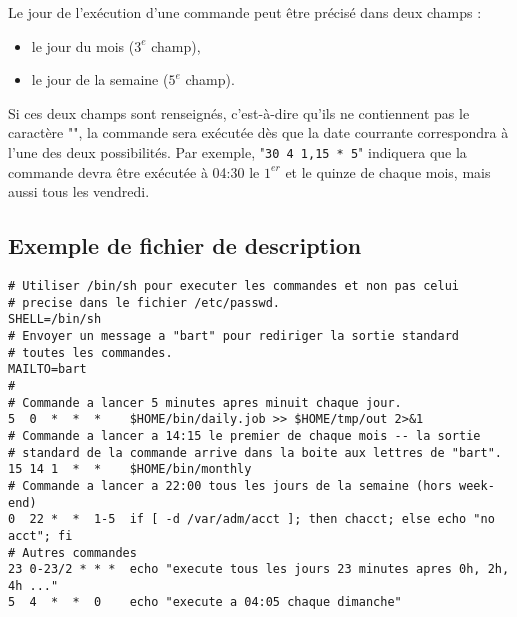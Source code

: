 \begin{remarque}
Le jour de l'ex{\'e}cution d'une commande peut {\^e}tre pr{\'e}cis{\'e} dans deux champs :
\begin{itemize}
	\item	le jour du mois ($3^e$ champ),
	\item	le jour de la semaine ($5^e$ champ).
\end{itemize}
Si ces deux champs sont renseign{\'e}s, c'est-{\`a}-dire qu'ils ne contiennent pas le
caract{\`e}re "{\tt *}", la commande sera ex{\'e}cut{\'e}e d{\`e}s que la date courrante correspondra
{\`a} l'une des deux possibilit{\'e}s. Par exemple, "{\tt 30 4 1,15 * 5}" indiquera que la
commande devra {\^e}tre ex{\'e}cut{\'e}e {\`a} 04:30 le $1^{er}$ et le quinze de chaque mois, mais
aussi tous les vendredi.
\end{remarque}

\subsection{Exemple de fichier de description}

\begin{example}
\begin{verbatim}
# Utiliser /bin/sh pour executer les commandes et non pas celui
# precise dans le fichier /etc/passwd.
SHELL=/bin/sh
# Envoyer un message a "bart" pour rediriger la sortie standard
# toutes les commandes.
MAILTO=bart
#
# Commande a lancer 5 minutes apres minuit chaque jour.
5  0  *  *  *    $HOME/bin/daily.job >> $HOME/tmp/out 2>&1
# Commande a lancer a 14:15 le premier de chaque mois -- la sortie
# standard de la commande arrive dans la boite aux lettres de "bart".
15 14 1  *  *    $HOME/bin/monthly
# Commande a lancer a 22:00 tous les jours de la semaine (hors week-end)
0  22 *  *  1-5  if [ -d /var/adm/acct ]; then chacct; else echo "no acct"; fi
# Autres commandes
23 0-23/2 * * *  echo "execute tous les jours 23 minutes apres 0h, 2h, 4h ..."
5  4  *  *  0    echo "execute a 04:05 chaque dimanche"
\end{verbatim}
\end{example}

